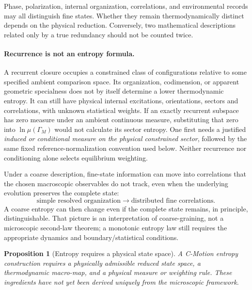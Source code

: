 \documentclass[11pt]{article}
\newtheorem{proposition}[theorem]{Proposition}
\theoremstyle{definition}
\newcommand{\cmotion}{\mbox{C-Motion}}
\begin{document}
Phase, polarization, internal organization, correlations, and environmental records may
all distinguish fine states.  Whether they remain thermodynamically distinct depends on
the physical reduction.  Conversely, two mathematical descriptions related only by a
true redundancy should not be counted twice.

\paragraph{Recurrence is not an entropy formula.}
A recurrent closure occupies a constrained class of configurations relative
to some specified ambient comparison space. Its organization, codimension,
or apparent geometric specialness does not by itself determine a lower
thermodynamic entropy. It can still have physical internal excitations,
orientations, sectors and correlations, with unknown statistical weights.
If an exactly recurrent subspace has zero measure under an ambient continuous
measure, substituting that zero into $\ln\mu(\Gamma_M)$ would not calculate
its sector entropy. One first needs a justified \emph{induced or conditional
measure on the physical constrained sector}, followed by the same fixed
reference-normalization convention used below. Neither recurrence nor
conditioning alone selects equilibrium weighting.

Under a coarse description, fine-state information can move into
correlations that the chosen macroscopic observables do not track, even when
the underlying evolution preserves the complete state:
\begin{equation}
  \boxed{
  \text{simple resolved organization}
  \longrightarrow
  \text{distributed fine correlations}.}
  \label{eq:correlation-redistribution}
\end{equation}
A coarse entropy can then change even if the complete state remains, in principle,
distinguishable.  That picture is an interpretation of coarse-graining, not a microscopic
second-law theorem; a monotonic entropy law still requires the appropriate dynamics and
boundary/statistical conditions.

\begin{proposition}[Entropy requires a physical state space]
\label{prop:reduction-gate}
A \cmotion{} entropy construction requires a physically admissible reduced state space,
a thermodynamic macro-map, and a physical measure or weighting rule.  These ingredients
have not yet been derived uniquely from the microscopic framework.
\end{proposition}
\end{document}
